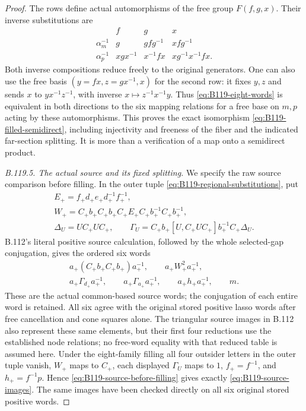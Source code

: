 \begin{proof}
The rows define actual automorphisms of the free group $F(f,g,x)$.
Their inverse substitutions are
\begin{equation}\label{eq:B119-base-inverses}
 \begin{array}{c|ccc}
       &f&g&x\\ \hline
 \alpha_m^{-1}&g&gfg^{-1}&xfg^{-1}\\
 \alpha_p^{-1}&xgx^{-1}&x^{-1}fx&xg^{-1}x^{-1}fx.
 \end{array}
\end{equation}
Both inverse compositions reduce freely to the original generators.
One can also use the free basis $(y=fx,z=gx^{-1},x)$ for the
second row: it fixes $y,z$ and sends $x$ to $yx^{-1}z^{-1}$,
with inverse $x\mapsto z^{-1}x^{-1}y$.
Thus \eqref{eq:B119-eight-words} is equivalent in both directions
to the six mapping relations for a free base on $m,p$ acting by
these automorphisms. This proves the exact isomorphism
\eqref{eq:B119-filled-semidirect}, including injectivity and freeness
of the fiber and the indicated far-section splitting. It is more
than a verification of a map onto a semidirect product.

\emph{B.119.5. The actual source and its fixed splitting.}
We specify the raw source comparison before filling. In the outer tuple
\eqref{eq:B119-regional-substitutions}, put
\begin{equation}\label{eq:B119-raw-source-factors}
 \begin{gathered}
 E_+=f_+d_+e_+d_+^{-1}f_+^{-1},\\
 W_+=C_+b_+C_+b_+C_+E_+C_+b_+^{-1}C_+b_+^{-1},\\
 \Delta_U=UC_+UC_+,\qquad
 \Gamma_U=C_+b_+[U,C_+UC_+]b_+^{-1}C_+\Delta_U.
 \end{gathered}
\end{equation}
B.112's literal positive source calculation, followed by the whole
selected-gap conjugation, gives the ordered six words
\begin{equation}\label{eq:B119-source-before-filling}
 \begin{gathered}
 a_+(C_+b_+C_+b_+)a_+^{-1},\qquad a_+W_+^2a_+^{-1},\\
 a_+\Gamma_{d_+}a_+^{-1},\qquad
 a_+\Gamma_{a_+}a_+^{-1},\qquad
 a_+h_+a_+^{-1},\qquad m.
 \end{gathered}
\end{equation}
These are the actual common-based source words; the conjugation of
each entire word is retained. All six agree with the original stored
positive lasso words after free cancellation and cone squares alone.
The triangular source images in B.112 also represent these same
elements, but their first four reductions use the established node
relations; no free-word equality with that reduced table is assumed
here. Under the eight-family filling all four outsider
letters in the outer tuple vanish, $W_+$ maps to $C_+$, each
displayed $\Gamma_U$ maps to $1$, $f_+=f^{-1}$, and
$h_+=f^{-1}p$. Hence \eqref{eq:B119-source-before-filling} gives
exactly \eqref{eq:B119-source-images}. The same images have been
checked directly on all six original stored positive words.


\end{proof}
